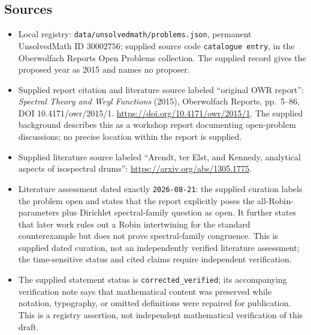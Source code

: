 \documentclass[11pt]{article}
\begin{document}
\subsection{Sources}
\begin{itemize}
\item Local registry: \texttt{data/unsolvedmath/problems.json}, permanent UnsolvedMath ID \(30002756\); supplied source code \texttt{catalogue entry}, in the Oberwolfach Reports Open Problems collection. The supplied record gives the proposed year as 2015 and names no proposer.
\item Supplied report citation and literature source labeled ``original OWR report'': \emph{Spectral Theory and Weyl Functions} (2015), Oberwolfach Reports, pp.~5--86, DOI 10.4171/owr/2015/1. \url{https://doi.org/10.4171/owr/2015/1}. The supplied background describes this as a workshop report documenting open-problem discussions; no precise location within the report is supplied.
\item Supplied literature source labeled ``Arendt, ter Elst, and Kennedy, analytical aspects of isospectral drums'': \url{https://arxiv.org/abs/1305.1775}.
\item Literature assessment dated exactly \texttt{2026-08-21}: the supplied curation labels the problem open and states that the report explicitly poses the all-Robin-parameters plus Dirichlet spectral-family question as open. It further states that later work rules out a Robin intertwining for the standard counterexample but does not prove spectral-family congruence. This is supplied dated curation, not an independently verified literature assessment; the time-sensitive status and cited claims require independent verification.
\item The supplied statement status is \texttt{corrected\_verified}; its accompanying verification note says that mathematical content was preserved while notation, typography, or omitted definitions were repaired for publication. This is a registry assertion, not independent mathematical verification of this draft.
\end{itemize}
\end{document}
